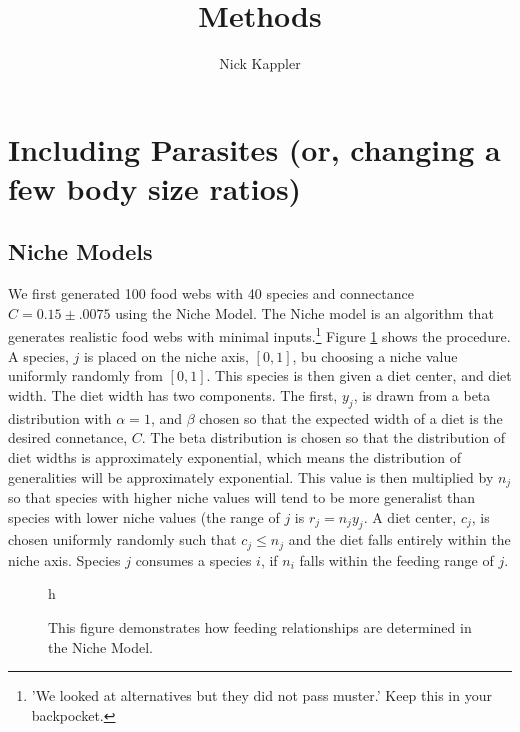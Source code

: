 \documentclass[11pt]{amsart}
\title{Methods}
\author{Nick Kappler}
\begin{document}
\maketitle
\section{Including Parasites (or, changing a few body size ratios)}


\subsection{Niche Models\label{sec:structure}}

We first generated 100 food webs with 40 species and connectance $C=0.15\pm .0075$ using the Niche Model.  The Niche model is an algorithm that generates realistic food webs with minimal inputs.\footnote{'We looked at alternatives but they did not pass muster.' Keep this in your backpocket.}  Figure \ref{fig:nicheModel} shows the procedure.  A species, $j$ is placed on the niche axis, $[0,1]$, bu choosing a niche value uniformly randomly from $[0,1]$.  This species is then given a diet center, and diet width.  The diet width has two components.  The first, $y_j$, is drawn from a beta distribution with $\alpha = 1$, and $\beta$ chosen so that the expected width of a diet is the desired connetance, $C$.  The beta distribution is chosen so that the distribution of diet widths is approximately exponential, which means the distribution of generalities will be approximately exponential.  This value is then multiplied by $n_j$ so that species with higher niche values will tend to be more generalist than species with lower niche values (the range of $j$ is $r_j = n_jy_j$.  A diet center, $c_j$, is chosen uniformly randomly such that $c_j \leq n_j$ and the diet falls entirely within the niche axis.  Species $j$ consumes a species $i$, if $n_i$ falls within the feeding range of $j$.  


\begin{figure}{h}
\caption{This figure demonstrates how feeding relationships are determined in the Niche Model.\label{fig:nicheModel}}
\end{figure}
\end{document}
